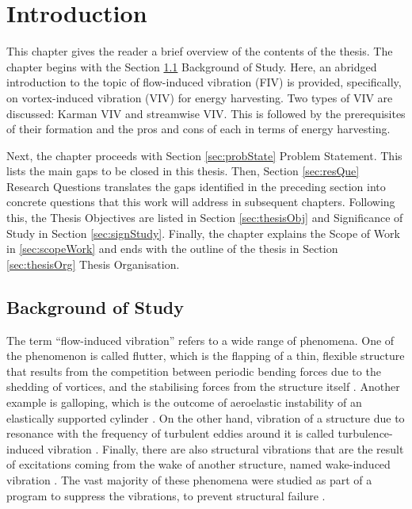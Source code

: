 \documentclass[oneside]{utmthesis}
\begin{document}
\listofappendices


\mainmatter

\captionsetup[figure]{labelsep=quad}
\captionsetup[table]{labelsep=quad}

\chapter{Introduction} \label{chap:introduction}
This chapter gives the reader a brief overview of the contents of the thesis. The chapter begins with the Section \ref{sec:backStudy} Background of Study. Here, an abridged introduction to the topic of flow-induced vibration (FIV) is provided, specifically, on vortex-induced vibration (VIV) for energy harvesting. Two types of VIV are discussed: Karman VIV and streamwise VIV. This is followed by the prerequisites of their formation and the pros and cons of each in terms of energy harvesting.

Next, the chapter proceeds with Section \ref{sec:probState} Problem Statement. This lists the main gaps to be closed in this thesis. Then, Section \ref{sec:resQue} Research Questions translates the gaps identified in the preceding section into concrete questions that this work will address in subsequent chapters. Following this, the Thesis Objectives are listed in Section \ref{sec:thesisObj} and Significance of Study in Section \ref{sec:signStudy}. Finally, the chapter explains the Scope of Work in \ref{sec:scopeWork} and ends with the outline of the thesis in Section \ref{sec:thesisOrg} Thesis Organisation.

\section{Background of Study} \label{sec:backStudy}
The term “flow-induced vibration” refers to a wide range of phenomena. One of the phenomenon is called flutter, which is the flapping of a thin, flexible structure that results from the competition between periodic bending forces due to the shedding of vortices, and the stabilising forces from the structure itself \citep{Xia2015a}. Another example is galloping, which is the outcome of aeroelastic instability of an elastically supported cylinder \citep{Kluger2013}. On the other hand, vibration of a structure due to resonance with the frequency of turbulent eddies around it is called turbulence-induced vibration \citep{Nakamura2013}. Finally, there are also structural vibrations that are the result of excitations coming from the wake of another structure, named wake-induced vibration \citep{Derakhshandeh2014}. The vast majority of these phenomena were studied as part of a program to suppress the vibrations, to prevent structural failure \citep{Khalak1999}.
\end{document}
